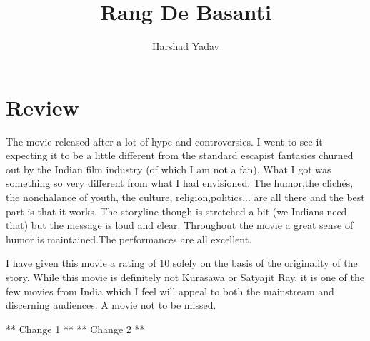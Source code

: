 \documentclass[a4paper,10pt]{article}
\title{Rang De Basanti}
\author{Harshad Yadav}
\begin{document}
\maketitle

\section{Review}
The movie released after a lot of hype and controversies. I went to see it expecting it to be a little different from the standard escapist fantasies churned out by the Indian film industry (of which I am not a fan). What I got was something so very different from what I had envisioned. The humor,the clichés, the nonchalance of youth, the culture, religion,politics... are all there and the best part is that it works. The storyline though is stretched a bit (we Indians need that) but the message is loud and clear. Throughout the movie a great sense of humor is maintained.The performances are all excellent.

I have given this movie a rating of 10 solely on the basis of the originality of the story. While this movie is definitely not Kurasawa or Satyajit Ray, it is one of the few movies from India which I feel will appeal to both the mainstream and discerning audiences. A movie not to be missed. 

** Change 1 **
** Change 2 **
\end{document}
